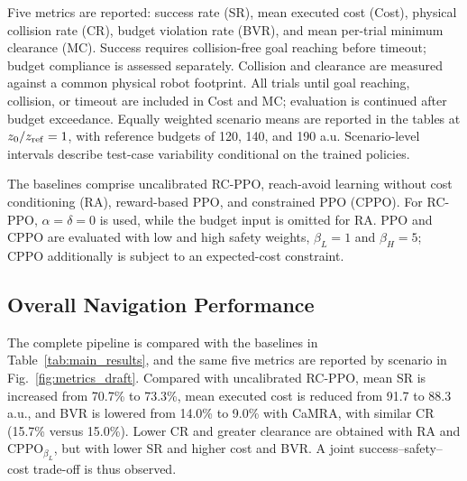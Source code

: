 \documentclass[conference]{IEEEtran}
\begin{document}
Five metrics are reported: success rate (SR), mean executed cost (Cost), physical
collision rate (CR), budget violation rate (BVR), and mean per-trial minimum
clearance (MC). Success requires collision-free goal reaching before timeout;
budget compliance is assessed separately. Collision and clearance are measured
against a common physical robot footprint. All trials until goal reaching,
collision, or timeout are included in Cost and MC; evaluation is continued after
budget exceedance. Equally weighted scenario means are reported in the tables at $z_0/z_{\rm ref}=1$,
with reference budgets of 120, 140, and 190 a.u. Scenario-level intervals describe
test-case variability conditional on the trained policies.

The baselines comprise uncalibrated RC-PPO, reach-avoid learning without cost
conditioning (RA), reward-based PPO, and constrained PPO (CPPO). For RC-PPO,
$\alpha=\delta=0$ is used, while the budget input is omitted for RA. PPO and CPPO are evaluated
with low and high safety weights, $\beta_L=1$ and $\beta_H=5$; CPPO additionally
is subject to an expected-cost constraint.

\subsection{Overall Navigation Performance}
\label{sec:overall_performance}
The complete pipeline is compared with the baselines in Table~\ref{tab:main_results},
and the same five metrics are reported by scenario in Fig.~\ref{fig:metrics_draft}.
Compared with uncalibrated RC-PPO, mean SR is increased from 70.7\% to
73.3\%, mean executed cost is reduced from 91.7 to 88.3 a.u., and BVR is lowered from
14.0\% to 9.0\% with CaMRA, with similar CR (15.7\% versus 15.0\%). Lower CR
and greater clearance are obtained with RA and CPPO$_{\beta_L}$, but with lower
SR and higher cost and BVR. A joint success--safety--cost trade-off is thus observed.
\end{document}
